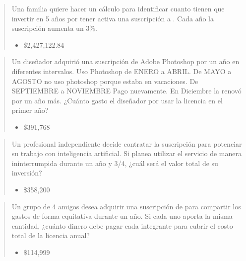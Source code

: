 \documentclass[letterpaper,10pt,spanish]{sphinxmanual}
\begin{document}
\begin{enumerate}
\begin{quote}
\sphinxAtStartPar
Una familia quiere hacer un cálculo para identificar cuanto tienen que invertir en 5 años por tener activa una suscripción a . Cada año la suscripción aumenta un 3\%.
\begin{itemize}
\item {} 
\sphinxAtStartPar
{} \$2,427,122.84

\end{itemize}
\end{quote}
\begin{quote}

\sphinxAtStartPar
Un diseñador adquirió una suscripción de Adobe Photoshop por un año en diferentes intervalos. Uso Photoshop de ENERO a ABRIL. De MAYO a AGOSTO no uso photoshop porque estaba en vacaciones. De SEPTIEMBRE a NOVIEMBRE Pago nuevamente. En Diciembre la renovó por un año más. ¿Cuánto gasto el diseñador por usar la licencia en el primer año?
\begin{itemize}
\item {} 
\sphinxAtStartPar
{} \$391,768

\end{itemize}
\end{quote}
\begin{quote}

\sphinxAtStartPar
Un profesional independiente decide contratar la suscripción  para potenciar su trabajo con inteligencia artificial. Si planea utilizar el servicio de manera ininterrumpida durante un año y 3/4, ¿cuál será el valor total de su inversión?
\begin{itemize}
\item {} 
\sphinxAtStartPar
{} \$358,200

\end{itemize}
\end{quote}
\begin{quote}

\sphinxAtStartPar
Un grupo de 4 amigos desea adquirir una suscripción de  para compartir los gastos de forma equitativa durante un año. Si cada uno aporta la misma cantidad, ¿cuánto dinero debe pagar cada integrante para cubrir el costo total de la licencia anual?
\begin{itemize}
\item {} 
\sphinxAtStartPar
{} \$114,999


\end{itemize}
\end{quote}
\end{enumerate}
\end{document}
